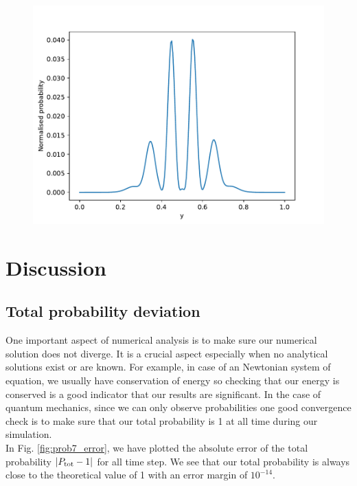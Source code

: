 \documentclass[english,notitlepage,reprint,nofootinbib]{revtex4-2}  %
\begin{document}
	\begin{figure}[h!]
		\centering
		\includegraphics[scale=0.55]{figures/triple_slit_detection.pdf}
		\caption{}
		\label{fig:prob9_triple}
	\end{figure}

	\section{Discussion}\label{sec:discussion}
	
	\subsection{Total probability deviation} \label{subsec:tot_prob_dev}
	
	One important aspect of numerical analysis is to make sure our numerical
	solution does not diverge. It is a crucial aspect especially when no 
	analytical solutions exist or are known. For example, in case of an 
	Newtonian system of equation, we usually have conservation of energy
	so checking that our energy is conserved is a good indicator that our
	results are significant. In the case of quantum mechanics, since we 
	can only observe probabilities one good convergence check is to make sure
	that our total probability is 1 at all time during our simulation. \\
	
	In Fig.	\ref{fig:prob7_error}, we have plotted the absolute error of 
	the total probability $|P_{\rm tot} - 1|$ for all time step. 
	We see that our total probability is always close to the theoretical 
	value of 1 with an error margin of $10^{-14}$.  \\
	
\end{document}

